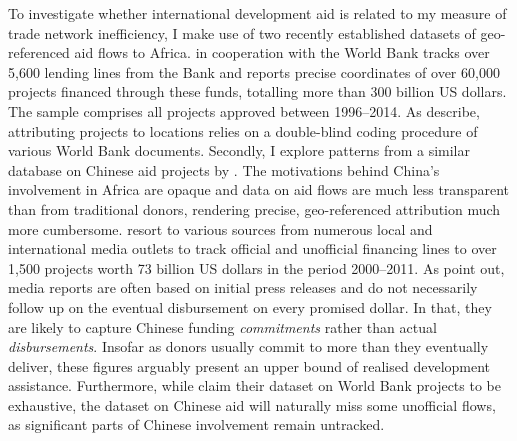 \documentclass[11pt, oneside]{article}   	%
\begin{document}
To investigate whether international development aid is related to my measure of trade network inefficiency, I make use of two recently established datasets of geo-referenced aid flows to Africa. \cite{AidData_WorldBankGeocoded_2017} in cooperation with the World Bank tracks over 5,600 lending lines from the Bank and reports precise coordinates of over 60,000 projects financed through these funds, totalling more than 300 billion US dollars. The sample comprises all projects approved between 1996--2014. As \cite{Strandow_UCDPAidDatacodebook_2011a} describe, attributing projects to locations relies on a double-blind coding procedure of various World Bank documents. Secondly, I explore patterns from a  similar database on Chinese aid projects by \cite{Strange_TrackingUnderreportedFinancial_2017}. The motivations behind China's involvement in Africa are opaque and data on aid flows are much less transparent than from traditional donors, rendering precise, geo-referenced attribution much more cumbersome. \citeauthor{Strange_TrackingUnderreportedFinancial_2017} resort to various sources from numerous local and international media outlets to track official and unofficial financing lines to over 1,500 projects worth 73 billion US dollars in the period 2000--2011. As \citeauthor{Strange_TrackingUnderreportedFinancial_2017} point out, media reports are often based on initial press releases and do not necessarily follow up on the eventual disbursement on every promised dollar. In that, they are likely to capture Chinese funding \emph{commitments} rather than actual \emph{disbursements}. Insofar as donors usually commit to more than they eventually deliver, these figures arguably present an upper bound of realised development assistance. Furthermore, while \cite{AidData_WorldBankGeocoded_2017} claim their dataset on World Bank projects to be exhaustive, the dataset on Chinese aid will naturally miss some unofficial flows, as significant parts of Chinese involvement remain untracked.
\end{document}
